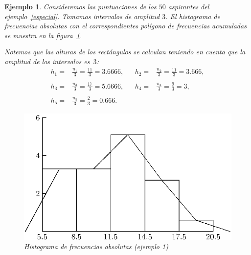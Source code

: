 \documentclass[12pt]{report}
\newtheorem{example}[definition]{Ejemplo}
\begin{document}
\begin{example}
Consideremos las puntuaciones de los $50$ aspirantes del ejemplo~\ref{especial}. Tomamos
intervalos  de amplitud $3$. El histograma de frecuencias absolutas con el
correspondientes polígono de frecuencias acumuladas se muestra en la
figura~\ref{EXEMPLE2}.

Notemos que las alturas de los rectángulos se calculan teniendo en cuenta que la amplitud
de los intervalos es~$3$:
\[
\begin{array}{rlcrl}
h_1 =& \frac{n_1}{3}=\frac{11}{3}=3.6666,& & h_2=& \frac{n_2}{3}= \frac{11}{3}=3.666,\\
&&&&\\ h_3 =& \frac{n_3}{3}=\frac{17}{3}=5.6666,& & h_4=& \frac{n_4}{3}= \frac{9}{3}=3,
\\ &&&&\\ h_5 = & \frac{n_5}{3}=\frac{2}{3}=0.666.&&&
\end{array}
\]

\begin{figure}
\begin{center}
\includegraphics{histograma.eps}
\end{center}
 \caption {Histograma de frecuencias absolutas (ejemplo 1)} \label{EXEMPLE2}
\end{figure}
\label{PUNTUACIONS}
\end{example}
\end{document}
